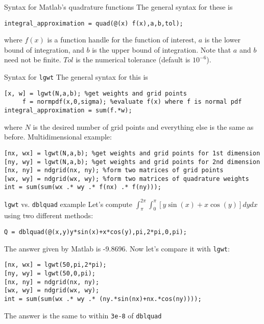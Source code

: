 \documentclass[english,xcolor=dvipsnames]{beamer}
\begin{document}
\begin{frame}[fragile]{Syntax for Matlab's quadrature functions}
The general syntax for these is
\begin{lstlisting}
integral_approximation = quad(@(x) f(x),a,b,tol);
\end{lstlisting}
where $f\left(x\right)$ is a function handle for the function of interest, $a$ is the lower bound of integration, and $b$ is the upper bound of integration. Note that $a$ and $b$ need not be finite. $Tol$ is the numerical tolerance (default is $10^{-6}$).
\end{frame}

\begin{frame}[fragile]{Syntax for \texttt{lgwt}}
The general syntax for this is
\begin{lstlisting}
[x, w] = lgwt(N,a,b); %get weights and grid points
     f = normpdf(x,0,sigma); %evaluate f(x) where f is normal pdf
integral_approximation = sum(f.*w);
\end{lstlisting}
where $N$ is the desired number of grid points and everything else is the same as before. Multidimensional example:
\begin{lstlisting}
[nx, wx] = lgwt(N,a,b); %get weights and grid points for 1st dimension
[ny, wy] = lgwt(N,a,b); %get weights and grid points for 2nd dimension
[nx, ny] = ndgrid(nx, ny); %form two matrices of grid points
[wx, wy] = ndgrid(wx, wy); %form two matrices of quadrature weights
int = sum(sum(wx .* wy .* f(nx) .* f(ny)));
\end{lstlisting}
\end{frame}

\begin{frame}[fragile]{\texttt{lgwt} vs. \texttt{dblquad} example}
Let's compute $\int_{\pi}^{2\pi}\int_{0}^{\pi} \left[y\sin\left(x\right)+x\cos\left(y\right)\right]dydx$ using two different methods:
\begin{lstlisting}
Q = dblquad(@(x,y)y*sin(x)+x*cos(y),pi,2*pi,0,pi);
\end{lstlisting}
The answer given by Matlab is -9.8696. Now let's compare it with \texttt{lgwt}:
\begin{lstlisting}
[nx, wx] = lgwt(50,pi,2*pi);
[ny, wy] = lgwt(50,0,pi);
[nx, ny] = ndgrid(nx, ny);
[wx, wy] = ndgrid(wx, wy);
int = sum(sum(wx .* wy .* (ny.*sin(nx)+nx.*cos(ny))));
\end{lstlisting}
The answer is the same to within \texttt{3e-8} of \texttt{dblquad}
\end{frame}
\end{document}
